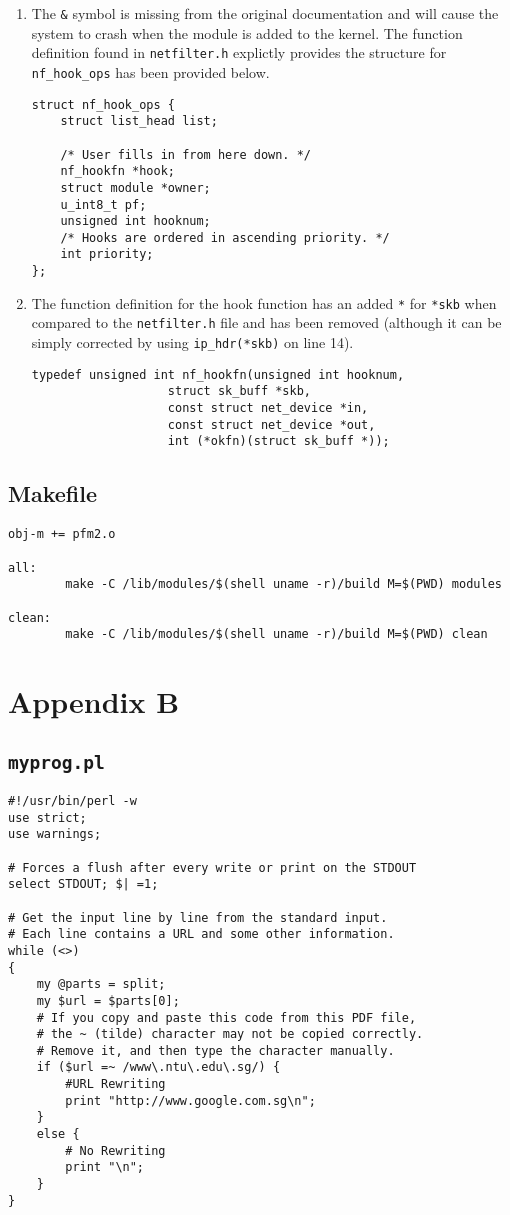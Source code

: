 \documentclass[a4paper,12pt]{article}
\begin{document}
\begin{enumerate}
\item The \texttt{\&} symbol is missing from the original documentation and will cause the system to crash when the module is added to the kernel. The function definition found in \texttt{netfilter.h} explictly provides the structure for \texttt{nf\_hook\_ops} has been provided below.
\begin{verbatim}
struct nf_hook_ops {
	struct list_head list;

	/* User fills in from here down. */
	nf_hookfn *hook;
	struct module *owner;
	u_int8_t pf;
	unsigned int hooknum;
	/* Hooks are ordered in ascending priority. */
	int priority;
};
\end{verbatim}
\item The function definition for the hook function has an added \texttt{*} for \texttt{*skb} when compared to the \texttt{netfilter.h} file and has been removed (although it can be simply corrected by using \texttt{ip\_hdr(*skb)} on line 14).
\begin{verbatim}
typedef unsigned int nf_hookfn(unsigned int hooknum,
			       struct sk_buff *skb,
			       const struct net_device *in,
			       const struct net_device *out,
			       int (*okfn)(struct sk_buff *));
\end{verbatim}
\end{enumerate}
\subsection{Makefile}
\begin{verbatim}
obj-m += pfm2.o

all:
        make -C /lib/modules/$(shell uname -r)/build M=$(PWD) modules

clean:
        make -C /lib/modules/$(shell uname -r)/build M=$(PWD) clean
\end{verbatim}
\section{Appendix B}
\label{ch:AppB}
\subsection{\texttt{myprog.pl}}
\begin{verbatim}
#!/usr/bin/perl -w
use strict;
use warnings;

# Forces a flush after every write or print on the STDOUT
select STDOUT; $| =1;

# Get the input line by line from the standard input.
# Each line contains a URL and some other information.
while (<>)
{
	my @parts = split;
	my $url = $parts[0];
	# If you copy and paste this code from this PDF file,
	# the ~ (tilde) character may not be copied correctly.
	# Remove it, and then type the character manually.
	if ($url =~ /www\.ntu\.edu\.sg/) {
		#URL Rewriting
		print "http://www.google.com.sg\n";
	}
	else {
		# No Rewriting
		print "\n";
	}
}
\end{verbatim}
\end{document}
